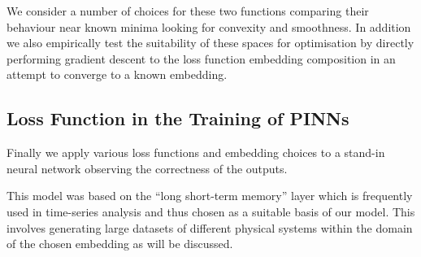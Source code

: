 We consider a number of choices for these two functions comparing their behaviour near known minima looking for convexity and smoothness. In addition we also empirically test the suitability of these spaces for optimisation by directly performing gradient descent to the loss function embedding composition in an attempt to converge to a known embedding.

\subsection{Loss Function in the Training of PINNs}

Finally we apply various loss functions and embedding choices to a stand-in neural network observing the correctness of the outputs.

This model was based on the \enquote{long short-term memory} layer \cite{hochreiterLongShortTermMemory1997} which is frequently used in time-series analysis and thus chosen as a suitable basis of our model. This involves generating large datasets of different physical systems within the domain of the chosen embedding as will be discussed.
